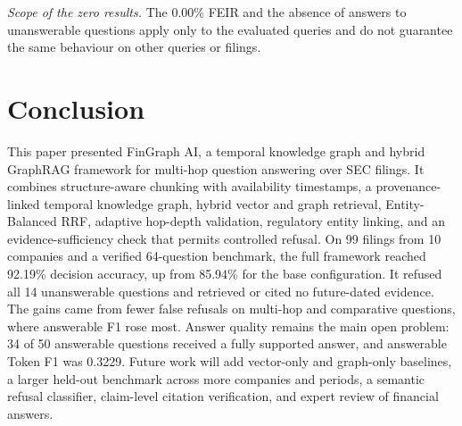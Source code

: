 \documentclass[conference]{IEEEtran}
\begin{document}
\textit{Scope of the zero results.} The 0.00\% FEIR and the absence of answers to unanswerable questions apply only to the evaluated queries and do not guarantee the same behaviour on other queries or filings.

\section{Conclusion}
This paper presented FinGraph AI, a temporal knowledge graph and hybrid GraphRAG framework for multi-hop question answering over SEC filings. It combines structure-aware chunking with availability timestamps, a provenance-linked temporal knowledge graph, hybrid vector and graph retrieval, Entity-Balanced RRF, adaptive hop-depth validation, regulatory entity linking, and an evidence-sufficiency check that permits controlled refusal. On 99 filings from 10 companies and a verified 64-question benchmark, the full framework reached 92.19\% decision accuracy, up from 85.94\% for the base configuration. It refused all 14 unanswerable questions and retrieved or cited no future-dated evidence. The gains came from fewer false refusals on multi-hop and comparative questions, where answerable F1 rose most. Answer quality remains the main open problem: 34 of 50 answerable questions received a fully supported answer, and answerable Token F1 was 0.3229. Future work will add vector-only and graph-only baselines, a larger held-out benchmark across more companies and periods, a semantic refusal classifier, claim-level citation verification, and expert review of financial answers.
\end{document}
